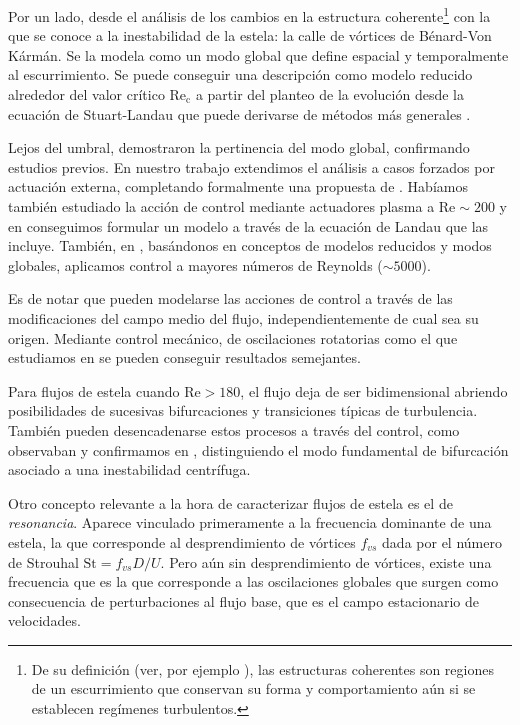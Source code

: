 \documentclass[12pt]{article}
\begin{document}
 Por un lado, desde el análisis de los cambios en la estructura coherente\footnote{ De su definición (ver, por ejemplo \cite{hussain1986}), las estructuras coherentes son regiones de un escurrimiento que conservan su forma y comportamiento aún si se establecen regímenes turbulentos.} con la que se conoce a la inestabilidad de la estela: la calle de vórtices de Bénard-Von Kármán.  Se la modela como un modo global \cite{zielinska,barkley2006} que define espacial y temporalmente al escurrimiento. Se puede conseguir una descripción como modelo reducido alrededor del valor crítico $\mathrm{Re_c}$ a partir del planteo de la evolución desde la ecuación de Stuart-Landau\cite{stuart58, provansal1987} que puede derivarse de métodos más generales \cite{noack2003a,dadamo2007}.
 
 
 Lejos del umbral, \citet{gallaire2016} demostraron  la pertinencia del modo global, confirmando estudios previos\cite{barkley2006,sipp2007}. En nuestro trabajo \cite{boury2018forced} extendimos el análisis a casos forzados por actuación externa, completando formalmente una propuesta de \cite{thiria2007}. Habíamos también  estudiado la acción de control mediante actuadores plasma\cite{dadamo2012} a $\mathrm{Re}\sim 200$ y en \cite{boury2018forced} conseguimos formular un modelo a través de la ecuación de Landau que las incluye. También, en \citet{dadamo2017a}, basándonos en conceptos de modelos reducidos y modos globales, aplicamos control a mayores números de Reynolds ($\sim 5000$).
 
  Es de notar que pueden modelarse las acciones de control a través de las modificaciones del campo medio del flujo, independientemente de cual sea su origen. Mediante control mecánico, de oscilaciones rotatorias  como el que estudiamos en \cite{dadamo2011b} se pueden conseguir resultados semejantes.

 Para flujos de estela cuando $\mathrm{Re}>180$, el flujo deja de ser bidimensional abriendo posibilidades de sucesivas bifurcaciones y transiciones típicas de turbulencia. También pueden desencadenarse estos procesos a través del control, como observaban \cite{thiria2007,dadamo2011b} y confirmamos en \cite{dadamo2015a}, distinguiendo el modo fundamental de bifurcación asociado a una inestabilidad centrífuga. 
 
 Otro concepto relevante a la hora de caracterizar flujos de estela es el de \textit{resonancia}. Aparece vinculado primeramente a la frecuencia dominante de una estela, la que corresponde al desprendimiento de vórtices $f_{vs}$ dada por el número de Strouhal $\mathrm{St}=f_{vs}D/U$. Pero aún sin desprendimiento de vórtices, existe una frecuencia que es la que corresponde a las oscilaciones globales que surgen como consecuencia de perturbaciones al flujo base, que es el campo estacionario de velocidades. 
 
\end{document}
